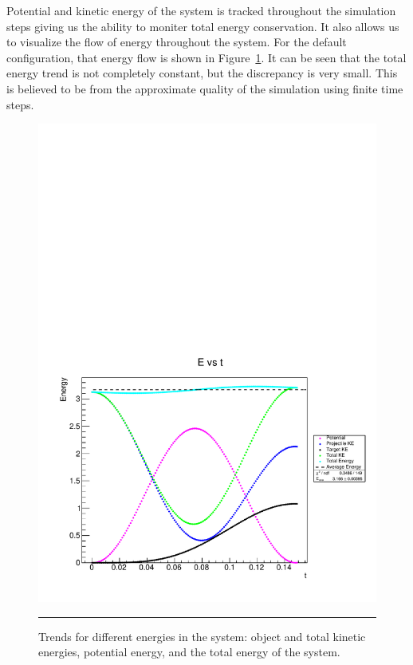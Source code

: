 \documentclass[aps,prl,floatfix,preprint,nofootinbib]{revtex4}
\begin{document}
Potential and kinetic energy of the system is tracked throughout the simulation steps giving us the ability to moniter total energy conservation. It also allows us to visualize the flow of energy throughout the system. For the default configuration, that energy flow is shown in Figure~\ref{fig:energy_default}. It can be seen that the total energy trend is not completely constant, but the discrepancy is very small. This is believed to be from the approximate quality of the simulation using finite time steps.
\begin{figure}
  \includegraphics[width=.8\textwidth]{plots/default/E_vs_t.pdf}
                  {\par\nobreak\rule[9pt]{35em}{0.5pt}\vspace{-5mm}}
                  \caption{Trends for different energies in the system: object and total kinetic energies, potential energy, and the total energy of the system.}
                  \label{fig:energy_default}
\end{figure}
\end{document}

